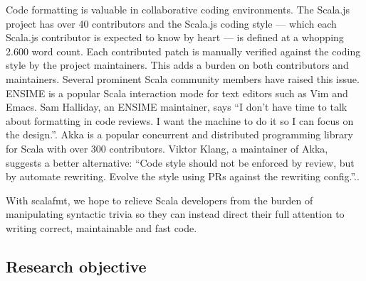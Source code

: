 Code formatting is valuable in collaborative coding environments.
The Scala.js project\autocite{_scala.js_????} has over 40 contributors and the Scala.js coding style\autocite{doeraene_scala.js_2015} --- which each Scala.js contributor is expected to know by heart --- is defined at a whopping 2.600 word count.
Each contributed patch is manually verified against the coding style by the project maintainers.
This adds a burden on both contributors and maintainers.
Several prominent Scala community members have raised this issue.
ENSIME\autocite{_ensime_????} is a popular Scala interaction mode for text editors such as Vim and Emacs.
Sam Halliday, an ENSIME maintainer, says ``I don't have time to talk about formatting in code reviews. I want the machine to do it so I can focus on the design.''\autocite{halliday_i_2016-1}.
Akka\autocite{_akka_????} is a popular concurrent and distributed programming library for Scala with over 300 contributors.
Viktor Klang, a maintainer of Akka, suggests a better alternative: ``Code style should not be enforced by review, but by automate rewriting. Evolve the style using PRs against the rewriting config.''.\autocite{klang_code_2016}.

With scalafmt, we hope to relieve Scala developers from the burden of manipulating syntactic trivia so they can instead direct their full attention to writing correct, maintainable and fast code.

\subsection{Research objective}

